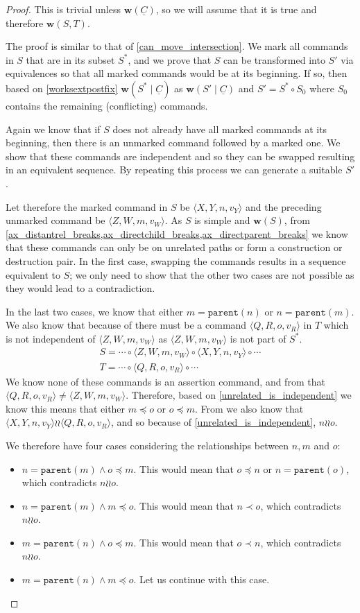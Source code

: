 \documentclass[12pt]{article}
\newcommand{\parent}{\mathtt{parent}}
\newcommand{\valvy}{v_Y} %
\newcommand{\valvw}{v_W}
\newcommand{\valvr}{v_R}
\newcommand{\caaaa}[4]{\langle{#1,#2,#3,#4}\rangle}
\newcommand{\cxynv}{\caaaa{X}{Y}{n}{\valvy}}
\newcommand{\czwmv}{\caaaa{Z}{W}{m}{\valvw}}
\newcommand{\cqrov}{\caaaa{Q}{R}{o}{\valvr}}
\newcommand{\cc}{\circ} %
\newcommand{\descendant}{\prec}
\newcommand{\descendantEq}{\preceq}
\newcommand{\indep}{\mathrel{\wr\wr}} %
\newcommand{\unrel}{\indep} %
\newcommand{\workssign}{\mathbf{w}}
\newcommand{\works}[1]{\workssign({#1})}
\newcommand{\worksc}[2]{\workssign({#1}\mathrel{|}{#2})}
\newcommand{\seqset}[1]{\underline{#1}} %
\theoremstyle{definition}
\begin{document}
\begin{proof}
This is trivial unless $\works{\seqset{C}}$, so we will assume that it is true
and therefore $\works{S,T}$.

The proof is similar to that of \cref{can_move_intersection}.
We mark all commands in $S$ that are in its subset $S^*$, and
we prove that $S$ can be transformed into $S'$ via equivalences
so that all marked commands would be at its beginning.
If so, then based on \cref{worksextpostfix}
$\worksc{S^*}{\seqset{C}}$ as $\worksc{S'}{\seqset{C}}$ and $S'=S^*\cc S_0$ 
where $S_0$ contains the remaining (conflicting) commands.

Again we know that if $S$ does not already have all marked commands at its beginning,
then there is an unmarked command followed by a marked one.
We show that these commands are independent and so they can be swapped
resulting in an equivalent sequence.
By repeating this process we can generate a suitable $S'$.

Let therefore the marked command in $S$ be $\cxynv$
and the preceding unmarked command be $\czwmv$.
As $S$ is simple and $\works{S}$, from 
\cref{ax_distantrel_breaks,ax_directchild_breaks,ax_directparent_breaks}
we know that these commands can only be on unrelated paths or form a construction or destruction pair.
In the first case, swapping the commands results in a sequence equivalent to $S$;
we only need to show that the other two cases are not possible as they would lead to a contradiction.

In the last two cases, we know that either $m=\parent(n)$ or $n=\parent(m)$.
We also know that because of {\condApr} there must be 
a command $\cqrov$ in $T$ which is not independent of $\czwmv$
as $\czwmv$ is not part of $S^*$.
\begin{gather*}
S = \cdots\cc  \czwmv\cc  \cxynv\cc  \cdots \\
T = \cdots\cc  \cqrov\cc \cdots
\end{gather*}
We know none of these commands is an assertion command, and 
from {\condDisj} that $\cqrov\neq\czwmv$.
Therefore, based on \cref{unrelated_is_independent} we know this means that
either $m\descendantEq o$ or $o\descendantEq m$.
From {\condApr} we also know that $\cxynv\indep \cqrov$,
and so because of \cref{unrelated_is_independent},
$n\unrel o$.

We therefore have four cases considering the relationships between $n,m$ and $o$:
\begin{itemize}
\item $n=\parent(m) \wedge o\descendantEq m$.
   This would mean that $o\descendantEq n$ or $n=\parent(o)$, which contradicts $n\unrel o$.
\item $n=\parent(m) \wedge m\descendantEq o$.
   This would mean that $n\descendant o$, which contradicts $n\unrel o$.
\item $m=\parent(n) \wedge o\descendantEq m$.
   This would mean that $o\descendant n$, which contradicts $n\unrel o$.
\item $m=\parent(n) \wedge m\descendantEq o$.
   Let us continue with this case.
\end{itemize}


\end{proof}
\end{document}
